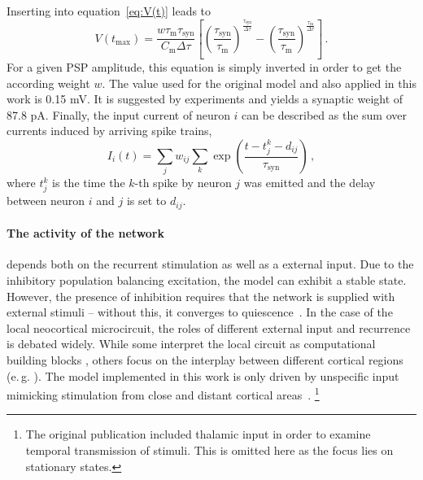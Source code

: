 Inserting into equation~\eqref{eq:V(t)} leads to 
\begin{equation}
    V(t_\text{max}) 
        = \frac{w \tau_\text{m} \tau_\text{syn}}{C_\text{m} \Delta\tau}	
            \left[ 
                \left( \frac{\tau_\text{syn}}{\tau_\text{m}} \right)^\frac{\tau_\text{syn}}{\Delta\tau} 
            - \left( \frac{\tau_\text{syn}}{\tau_\text{m}} \right)^\frac{\tau_\text{m}}{\Delta\tau} 
            \right] \,.
    \label{eq:PSP}
\end{equation}
For a given PSP amplitude, this equation is simply inverted in order to get the according 
weight $w$. The value used for the original model and also applied in this work 
is 0.15 mV. It is suggested by experiments and yields 
a synaptic weight of 87.8 pA. 
Finally, the 
input current of neuron $i$ can be described as the sum over currents induced by
arriving spike trains, 
\begin{equation}
    I_i(t) = \sum_j w_{ij} \sum_k \exp\left(\frac{t - t_j^k - d_{ij}}{\tau_\text{syn}}\right) \, ,
    \label{eq:input_current}
\end{equation}
where $t_j^k$ is the time the $k$-th spike by neuron $j$ was emitted and the 
delay between neuron $i$ and $j$ is set to $d_{ij}$. 

\paragraph{The activity of the network} depends both on the recurrent stimulation as well as
a external input. Due to the inhibitory population balancing excitation, 
the model can exhibit a stable state. However, the presence of inhibition requires that 
the network is supplied with external stimuli -- without this, it converges to 
quiescence~\cite{brunel2000}.
In the case of the local neocortical microcircuit, the roles of different
external input and recurrence is debated widely. While some interpret the local circuit
as computational building blocks \cite{potjans2014}, others focus on the interplay between 
different cortical regions (e.\,g. ). 
The model implemented in this work is only driven 
by unspecific input mimicking stimulation from close and distant cortical areas~\cite{potjans2014}.%
\footnote{
The original publication included thalamic input in order to examine temporal transmission 
of stimuli. This is omitted here as the focus lies on stationary states. 
}

